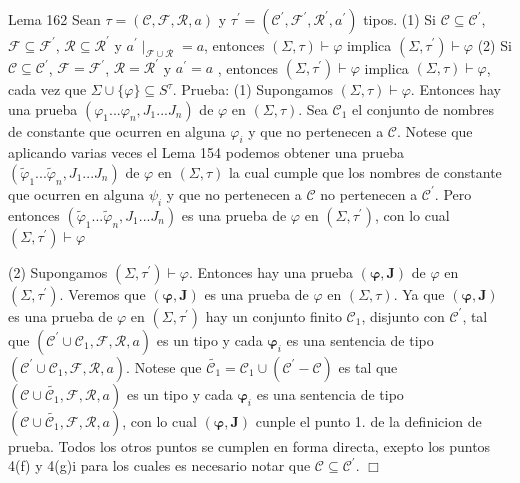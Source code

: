 Lema 162 Sean \(\tau =(\mathcal{C},\mathcal{F},\mathcal{R},a)\) y \(\tau ^{\prime }=(\mathcal{C}^{\prime },\mathcal{F}^{\prime },\mathcal{R} ^{\prime },a^{\prime })\) tipos.
(1) Si \(\mathcal{C}\subseteq \mathcal{C}^{\prime }\), \(\mathcal{F} \subseteq \mathcal{F}^{\prime }\), \(\mathcal{R}\subseteq \mathcal{R}^{\prime } \) y \(a^{\prime }\mid _{\mathcal{F}\cup \mathcal{R}}=a\), entonces \((\Sigma ,\tau )\vdash \varphi \) implica \((\Sigma ,\tau ^{\prime })\vdash \varphi \)
(2) Si \(\mathcal{C}\subseteq \mathcal{C}^{\prime }\), \(\mathcal{F}= \mathcal{F}^{\prime }\), \(\mathcal{R}=\mathcal{R}^{\prime }\) y \(a^{\prime }=a\) , entonces \((\Sigma ,\tau ^{\prime })\vdash \varphi \) implica \((\Sigma ,\tau )\vdash \varphi \), cada vez que \(\Sigma \cup \{\varphi \}\subseteq S^{\tau }. \)
Prueba: (1) Supongamos \((\Sigma ,\tau )\vdash \varphi \). Entonces hay una prueba \( (\varphi _{1}...\varphi _{n},J_{1}...J_{n})\) de \(\varphi \) en \((\Sigma ,\tau )\). Sea \(\mathcal{C}_{1}\) el conjunto de nombres de constante que ocurren en alguna \(\varphi _{i}\) y que no pertenecen a \(\mathcal{C}.\) Notese que aplicando varias veces el Lema 154 podemos obtener una prueba \( (\tilde{\varphi}_{1}...\tilde{\varphi}_{n},J_{1}...J_{n})\) de \(\varphi \) en \( (\Sigma ,\tau )\) la cual cumple que los nombres de constante que ocurren en alguna \(\psi _{i}\) y que no pertenecen a \(\mathcal{C}\) no pertenecen a \( \mathcal{C}^{\prime }\). Pero entonces \((\tilde{\varphi}_{1}...\tilde{\varphi} _{n},J_{1}...J_{n})\) es una prueba de \(\varphi \) en \((\Sigma ,\tau ^{\prime })\), con lo cual \((\Sigma ,\tau ^{\prime })\vdash \varphi \)

(2) Supongamos \((\Sigma ,\tau ^{\prime })\vdash \varphi \). Entonces hay una prueba \((\mathbf{\varphi },\mathbf{J})\) de \(\varphi \) en \((\Sigma ,\tau ^{\prime })\). Veremos que \((\mathbf{\varphi },\mathbf{J})\) es una prueba de \( \varphi \) en \((\Sigma ,\tau )\). Ya que \((\mathbf{\varphi },\mathbf{J})\) es una prueba de \(\varphi \) en \((\Sigma ,\tau ^{\prime })\) hay un conjunto finito \(\mathcal{C}_{1}\), disjunto con \(\mathcal{C}^{\prime }\), tal que \(( \mathcal{C}^{\prime }\cup \mathcal{C}_{1},\mathcal{F},\mathcal{R},a)\) es un tipo y cada \(\mathbf{\varphi }_{i}\) es una sentencia de tipo \((\mathcal{C} ^{\prime }\cup \mathcal{C}_{1},\mathcal{F},\mathcal{R},a)\). Notese que \( \widetilde{\mathcal{C}_{1}}=\mathcal{C}_{1}\cup (\mathcal{C}^{\prime }- \mathcal{C})\) es tal que \((\mathcal{C}\cup \widetilde{\mathcal{C}_{1}}, \mathcal{F},\mathcal{R},a)\) es un tipo y cada \(\mathbf{\varphi }_{i}\) es una sentencia de tipo \((\mathcal{C}\cup \widetilde{\mathcal{C}_{1}},\mathcal{F}, \mathcal{R},a)\), con lo cual \((\mathbf{\varphi },\mathbf{J})\) cunple el punto 1. de la definicion de prueba. Todos los otros puntos se cumplen en forma directa, exepto los puntos 4(f) y 4(g)i para los cuales es necesario notar que \(\mathcal{C}\subseteq \mathcal{C}^{\prime }\). \(\Box\)

